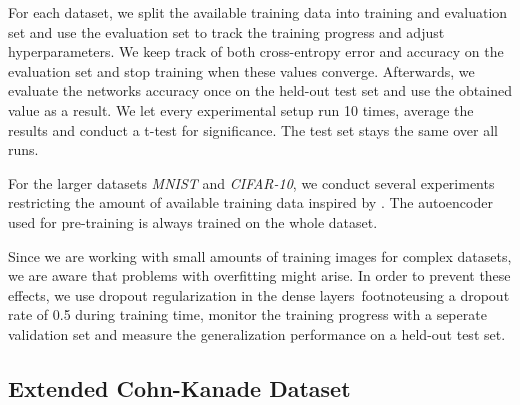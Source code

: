 \documentclass{article}
\begin{document}
    For each dataset, we split the available training data into training and evaluation set and use the evaluation set to track the training progress and adjust hyperparameters. We keep track of both cross-entropy error and accuracy on the evaluation set and stop training when these values converge. Afterwards, we evaluate the networks accuracy once on the held-out test set and use the obtained value as a result. We let every experimental setup run 10 times, average the results and conduct a t-test for significance. The test set stays the same over all runs. 
 
    For the larger datasets \emph{MNIST} and \emph{CIFAR-10}, we conduct several experiments restricting the amount of available training data inspired by \citep{masci2011stacked}. The autoencoder used for pre-training is always trained on the whole dataset. 

    Since we are working with small amounts of training images for complex datasets, we are aware that problems with overfitting might arise. In order to prevent these effects, we use dropout regularization in the dense layers~footnote{using a dropout rate of 0.5 during training time}, monitor the training progress with a seperate validation set and measure the generalization performance on a held-out test set. 



  \subsection{Extended Cohn-Kanade Dataset}
\end{document}
